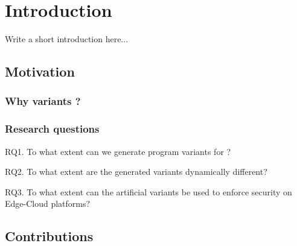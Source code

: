 \chapter{Introduction}

\newcommand{\rqone}{RQ1. To what extent can we generate program variants for \wasm?}
\newcommand{\rqtwo}{RQ2. To what extent are the generated variants dynamically different?}
\newcommand{\rqthree}{RQ3. To what extent can the artificial variants be used to enforce security on Edge-Cloud platforms?}

Write a short introduction here...


\section{Motivation}

\subsection{Why variants ?}

\subsection{Research questions}
\label{intro:definition:rq}

\rqone

\rqtwo

\rqthree

\section{Contributions}